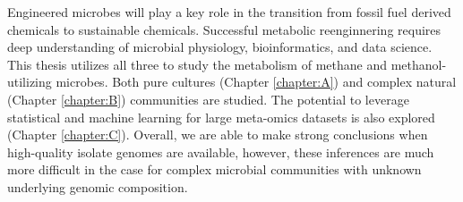 Engineered microbes will play a key role in the transition from fossil fuel derived chemicals to sustainable chemicals.
Successful metabolic reenginnering requires deep understanding of microbial physiology, bioinformatics, and data science.
This thesis utilizes all three to study the metabolism of methane and methanol-utilizing microbes.
Both pure cultures (Chapter \ref{chapter:A}) and complex natural (Chapter \ref{chapter:B}) communities are studied.
The potential to leverage statistical and machine learning for large meta-omics datasets is also explored (Chapter \ref{chapter:C}).
Overall, we are able to make strong conclusions when high-quality isolate genomes are available, however, these inferences are much more difficult in the case for complex microbial communities with unknown underlying genomic composition.


